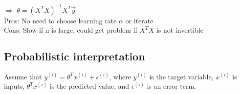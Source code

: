 \documentclass{article}
\begin{document}
$\Rightarrow$ $\theta = (X^TX)^{-1}X^T\vec y$\\
\noindent Pros: No need to choose learning rate $\alpha$ or iterate\\
\noindent Cons: Slow if n is large, could get problem if $X^TX$ is not invertible

\subsection{Probabilistic interpretation}
Assume that $y^{(i)} = \theta^Tx^{(i)} + \epsilon^{(i)}$, where $y^{(i)}$ is the target variable, $x^{(i)}$ is inputs, $\theta^Tx^{(i)}$ is the predicted value, and $\epsilon^{(i)}$ is an error term.
\end{document}
